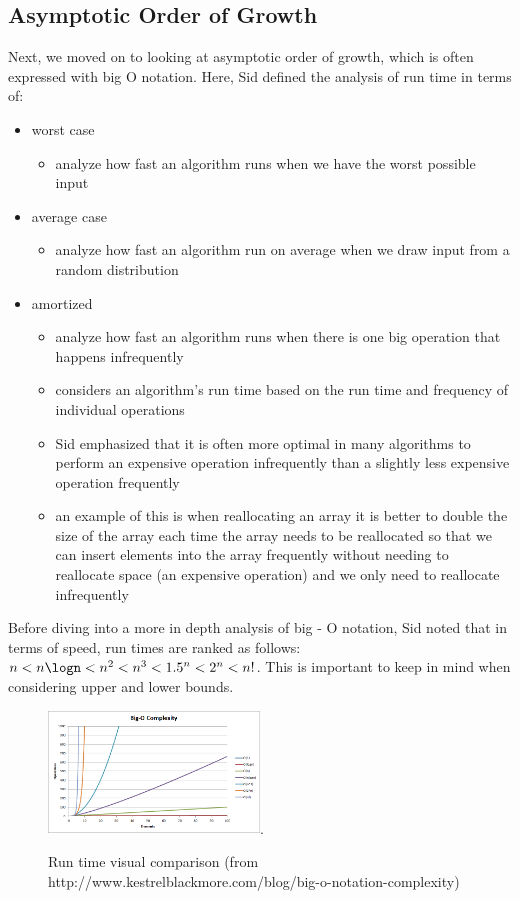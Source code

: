 \subsection{Asymptotic Order of Growth}
Next, we moved on to looking at asymptotic order of growth, which is often expressed with big O notation. Here, Sid defined the analysis of run time in terms of:
\begin{itemize}
    \item worst case
    \begin{itemize}
        \item analyze how fast an algorithm runs when we have the worst possible input
    \end{itemize}
    \item average case
    \begin{itemize}
        \item analyze how fast an algorithm run on average when we  draw input from a random distribution 
    \end{itemize}
    \item amortized
    \begin{itemize}
        \item analyze how fast an algorithm runs when there is one big operation that happens infrequently
        \item considers an algorithm's run time based on the run time and frequency of individual operations
        \item Sid emphasized that it is often more optimal in many algorithms to perform an expensive operation infrequently than a slightly less expensive operation frequently
        \item an example of this is when reallocating an array it is better to double the size of the array each time the array needs to be reallocated so that we can insert elements into the array frequently without needing to reallocate space (an expensive operation) and we only need to reallocate infrequently
    \end{itemize}
\end{itemize}
\vspace{3mm}
Before diving into a more in depth analysis of big - O notation, Sid noted that in terms of speed, run times are ranked as follows: $n < n\logn < n^2 < n^3 < {1.5}^n < 2^n <n!$. This is important to keep in mind when considering upper and lower bounds.

\begin{figure}[h!]
  \begin{center}
    \includegraphics[width=0.5\textwidth]{figures/big-o-complexity.png}.
    \caption{
      Run time visual comparison (from http://www.kestrelblackmore.com/blog/big-o-notation-complexity)}
    \label{fig:example_figure}
  \end{center}
\end{figure}


